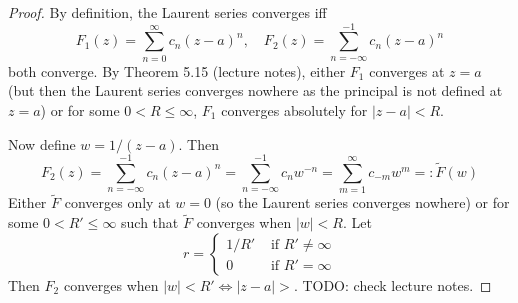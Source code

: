 \begin{proof}
	By definition, the Laurent series converges iff
	\[
		F_1(z) = \sum_{n = 0}^{\infty} c_n {(z - a)}^n, \quad F_2(z) = \sum_{n = -\infty}^{-1} c_n {(z - a)}^n
	\]
	both converge. By Theorem 5.15 (lecture notes), either $F_1$ converges at $z = a$ (but then the Laurent series converges nowhere as the principal is not defined at $z = a$) or for some $0 < R \le \infty$, $F_1$ converges absolutely for $|z - a| < R$.

	Now define $w = 1 / (z - a)$. Then
	\[
		F_2(z) = \sum_{n = -\infty}^{-1} c_n (z - a)^n = \sum_{n = -\infty}^{-1} c_n w^{-n} = \sum_{m = 1}^{\infty} c_{-m} w^m =: \tilde{F}(w)
	\]
	Either $\tilde{F}$ converges only at $w = 0$ (so the Laurent series converges nowhere) or for some $0 < R' \le \infty$ such that $\tilde{F}$ converges when $|w| < R$. Let
	\[
		r = \begin{cases}
			1 / R' & \text{ if } R' \ne \infty \\
			0 & \text{ if } R' = \infty
		\end{cases}
	\]
	Then $F_2$ converges when $|w| < R' \Longleftrightarrow |z - a| > $. TODO: check lecture notes. 
\end{proof}

